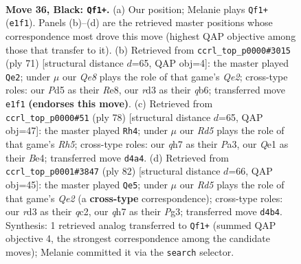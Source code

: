 \documentclass[11pt]{article}
\begin{document}
\clearpage

\begin{figure}[p]\centering
\begin{subfigure}{0.46\textwidth}\centering
\resizebox{\linewidth}{!}{%
\newchessgame
\chessboard[
  setfen={r7/p6Q/2k1p3/p2p4/3r2P1/2bR1K2/2P5/4q3 b - - 5 36},
  showmover=false,
  pgfstyle=straightmove, color=movearrow, markmove={e1-f1}
]}
\caption{}
\end{subfigure}\hfill
\begin{subfigure}{0.46\textwidth}\centering
\resizebox{\linewidth}{!}{%
\newchessgame
\chessboard[
  setfen={4r1k1/4q2p/1Q4p1/8/1p1p4/2b4P/P5P1/3R1R1K b - - 3 36},
  showmover=false,
  pgfstyle=straightmove, color=movearrow, markmove={e7-e2}
]}
\caption{}
\end{subfigure}
\\[4pt]
\begin{subfigure}{0.46\textwidth}\centering
\resizebox{\linewidth}{!}{%
\newchessgame
\chessboard[
  setfen={5r2/p5k1/7p/6rR/4B3/P4P2/KPP5/8 w - - 3 40},
  showmover=false,
  pgfstyle=straightmove, color=movearrow, markmove={h5-h4}
]}
\caption{}
\end{subfigure}\hfill
\begin{subfigure}{0.46\textwidth}\centering
\resizebox{\linewidth}{!}{%
\newchessgame
\chessboard[
  setfen={k7/p4p2/5P2/8/3B4/P1r3P1/2q1QPK1/8 w - - 1 42},
  showmover=false,
  pgfstyle=straightmove, color=movearrow, markmove={e2-e5}
]}
\caption{}
\end{subfigure}
\caption{\textbf{Move 36, Black: \texttt{Qf1+}.} (a) Our position; Melanie plays \texttt{Qf1+} (\texttt{e1f1}). Panels (b)--(d) are the retrieved master positions whose correspondence most drove this move (highest QAP objective among those that transfer to it). (b) Retrieved from \texttt{ccrl\_top\_p0000\#3015} (ply 71) [structural distance $d$=65, QAP obj=4]: the master played \texttt{Qe2}; under $\mu$ our \emph{Qe8} plays the role of that game's \emph{Qe2}; cross-type roles: our \emph{P}d5 as their \emph{R}e8, our \emph{r}d3 as their \emph{q}b6; transferred move \texttt{e1f1} \textbf{(endorses this move)}. (c) Retrieved from \texttt{ccrl\_top\_p0000\#51} (ply 78) [structural distance $d$=65, QAP obj=47]: the master played \texttt{Rh4}; under $\mu$ our \emph{Rd5} plays the role of that game's \emph{Rh5}; cross-type roles: our \emph{q}h7 as their \emph{P}a3, our \emph{Q}e1 as their \emph{B}e4; transferred move \texttt{d4a4}. (d) Retrieved from \texttt{ccrl\_top\_p0001\#3847} (ply 82) [structural distance $d$=66, QAP obj=45]: the master played \texttt{Qe5}; under $\mu$ our \emph{Rd5} plays the role of that game's \emph{Qe2} (a \textbf{cross-type} correspondence); cross-type roles: our \emph{r}d3 as their \emph{q}c2, our \emph{q}h7 as their \emph{P}g3; transferred move \texttt{d4b4}. Synthesis: 1 retrieved analog transferred to \texttt{Qf1+} (summed QAP objective 4, the strongest correspondence among the candidate moves); Melanie committed it via the \texttt{search} selector.}
\label{fig:thought-m71}
\end{figure}
\end{document}

